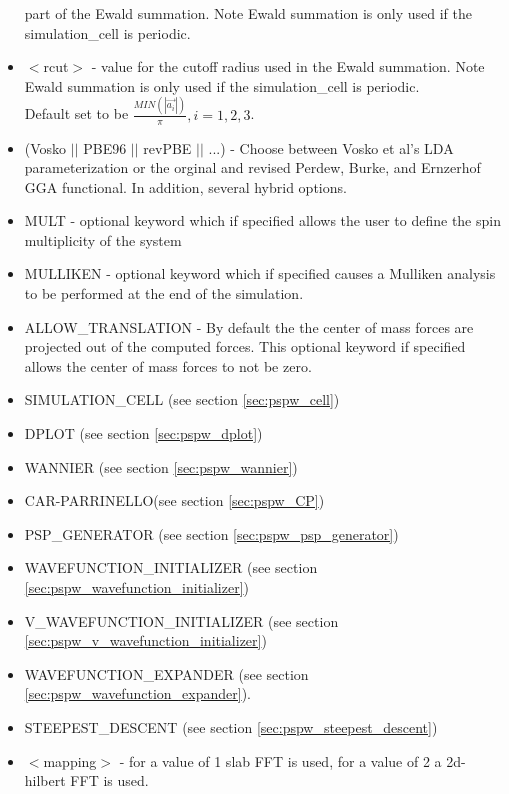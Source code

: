\begin{itemize}
                          part of the Ewald summation. Note Ewald summation
                          is only used if the simulation\_cell is periodic.
        \item $<$rcut$>$ - value for the cutoff radius used
                          in the Ewald summation. Note Ewald summation
                          is only used if the simulation\_cell is periodic. \\
                           Default set to be
                          $\frac{MIN(\left| \vec{a_i} \right|)}{\pi}, i=1,2,3$.
        \item (Vosko $||$ PBE96 $||$ revPBE $||$ ...) - Choose between Vosko et al's LDA 
                               parameterization or the orginal and revised Perdew, Burke, 
                               and Ernzerhof GGA functional.  In addition, several hybrid options.
        \item MULT - optional keyword which if specified allows the user to define the spin multiplicity
                     of the system
        \item MULLIKEN - optional keyword which if specified
                         causes a Mulliken analysis to be performed at
                         the end of the simulation.  
        \item ALLOW\_TRANSLATION - By default the the center of mass forces are projected out of the 
                                  computed forces. This optional keyword if specified allows the 
                                  center of mass forces to not be zero.

        \item SIMULATION\_CELL (see section \ref{sec:pspw_cell})
        \item DPLOT (see section \ref{sec:pspw_dplot})
        \item WANNIER (see section \ref{sec:pspw_wannier})
        \item CAR-PARRINELLO(see section \ref{sec:pspw_CP})
        \item PSP\_GENERATOR (see section \ref{sec:pspw_psp_generator})
        \item WAVEFUNCTION\_INITIALIZER (see section \ref{sec:pspw_wavefunction_initializer})
        \item V\_WAVEFUNCTION\_INITIALIZER (see section \ref{sec:pspw_v_wavefunction_initializer})
        \item WAVEFUNCTION\_EXPANDER (see section \ref{sec:pspw_wavefunction_expander}).
        \item STEEPEST\_DESCENT (see section \ref{sec:pspw_steepest_descent})

        \item $<$mapping$>$ - for a value of 1 slab FFT is used, for a value of 2 a 2d-hilbert FFT is used.
\end{itemize}

